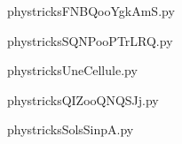     

    \clearpage
    


    \newcommand{\CaptionFigFNBQooYgkAmS}{<+Type your caption here+>}
    \begin{center}
        
    \end{center}
    phystricksFNBQooYgkAmS.py

    

    \clearpage
    


    \newcommand{\CaptionFigSQNPooPTrLRQ}{<+Type your caption here+>}
    \begin{center}
        
    \end{center}
    phystricksSQNPooPTrLRQ.py

    

    \clearpage
    


    \newcommand{\CaptionFigUneCellule}{<+Type your caption here+>}
    \begin{center}
        
    \end{center}
    phystricksUneCellule.py

    

    \clearpage
    


    \newcommand{\CaptionFigQIZooQNQSJj}{<+Type your caption here+>}
    \begin{center}
        
    \end{center}
    phystricksQIZooQNQSJj.py

    

    \clearpage
    


    \newcommand{\CaptionFigSolsSinpA}{<+Type your caption here+>}
    \begin{center}
        
    \end{center}
    phystricksSolsSinpA.py

    

    \clearpage
    


